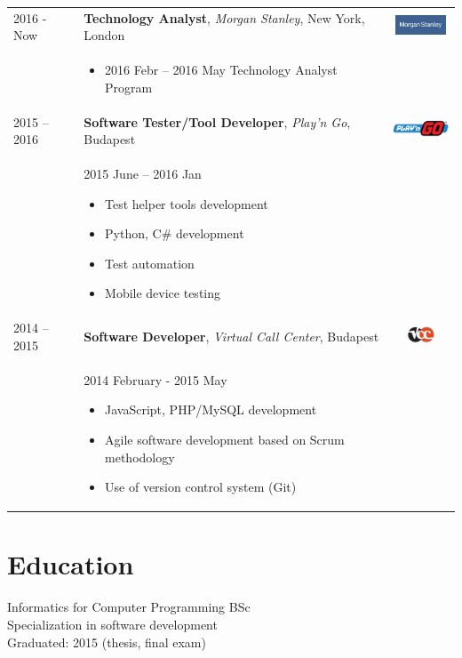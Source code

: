 \documentclass[12pt,a4paper,sans]{moderncv}   %
\newcommand{\frstCVcell}{2.5cm}
\begin{document}
\begin{tabularx}{\textwidth}{p{\frstCVcell}Xc}
  2016 - Now 
& 
  \textbf{Technology Analyst},
  \textit{Morgan Stanley},
  New York, London
& 
  \includegraphics[height=6mm]{morgan-logo.jpg}
\\ & 
  \begin{itemize}%
  \item 2016 Febr -- 2016 May Technology Analyst Program
  \end{itemize}
\\
  2015 -- 2016 
& 
  \textbf{Software Tester/Tool Developer},
  \textit{Play'n Go},
  Budapest
& 
  \includegraphics[height=6mm]{play-n-go-logo.png}
\\ & 
  2015 June -- 2016 Jan
  \begin{itemize}%
  \item Test helper tools development
  \item Python, C\# development
  \item Test automation
  \item Mobile device testing
  \end{itemize}
\\
  2014 -- 2015
& 
  \textbf{Software Developer},
  \textit{Virtual Call Center},
  Budapest
& 
  \includegraphics[height=5mm]{vcc-logo.png}
\\ &
  2014 February - 2015 May
  \begin{itemize}%
  \item JavaScript, PHP/MySQL development
  \item Agile software development based on Scrum methodology
  \item Use of version control system (Git)
  \end{itemize}
\end{tabularx}

\section{Education}
{Informatics for Computer Programming BSc \\  Specialization in software development \\ Graduated: 2015 (thesis, final exam)}
\end{document}
